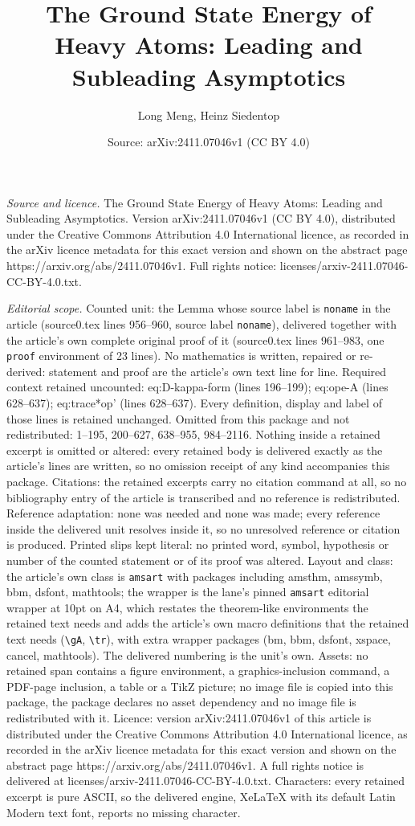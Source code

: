 \documentclass[10pt,a4paper]{amsart}
\title[The Ground State Energy of Heavy Atoms: Leading and Subleadi]{The Ground State Energy of Heavy Atoms: Leading and Subleading Asymptotics}
\author{Long Meng, Heinz Siedentop}
\date{Source: arXiv:2411.07046v1 (CC BY 4.0)}
\begin{document}
\maketitle

\noindent\emph{Source and licence.} The Ground State Energy of Heavy Atoms: Leading and Subleading Asymptotics. Version arXiv:2411.07046v1 (CC BY 4.0), distributed under the Creative Commons Attribution 4.0 International licence, as recorded in the arXiv licence metadata for this exact version and shown on the abstract page https://arxiv.org/abs/2411.07046v1. Full rights notice: licenses/arxiv-2411.07046-CC-BY-4.0.txt.\par\smallskip

\noindent\textit{Editorial scope.} Counted unit: the Lemma whose source label is \texttt{noname} in the article (source0.tex lines 956--960, source label \texttt{noname}), delivered together with the article's own complete original proof of it (source0.tex lines 961--983, one \texttt{proof} environment of 23 lines). No mathematics is written, repaired or re-derived: statement and proof are the article's own text line for line. Required context retained uncounted: eq:D-kappa-form (lines 196--199); eq:ope-A (lines 628--637); eq:trace*op' (lines 628--637). Every definition, display and label of those lines is retained unchanged. Omitted from this package and not redistributed: 1--195, 200--627, 638--955, 984--2116. Nothing inside a retained excerpt is omitted or altered: every retained body is delivered exactly as the article's lines are written, so no omission receipt of any kind accompanies this package. Citations: the retained excerpts carry no citation command at all, so no bibliography entry of the article is transcribed and no reference is redistributed. Reference adaptation: none was needed and none was made; every reference inside the delivered unit resolves inside it, so no unresolved reference or citation is produced. Printed slips kept literal: no printed word, symbol, hypothesis or number of the counted statement or of its proof was altered. Layout and class: the article's own class is \texttt{amsart} with packages including amsthm, amssymb, bbm, dsfont, mathtools; the wrapper is the lane's pinned \texttt{amsart} editorial wrapper at 10pt on A4, which restates the theorem-like environments the retained text needs and adds the article's own macro definitions that the retained text needs (\texttt{\textbackslash gA}, \texttt{\textbackslash tr}), with extra wrapper packages (bm, bbm, dsfont, xspace, cancel, mathtools). The delivered numbering is the unit's own. Assets: no retained span contains a figure environment, a graphics-inclusion command, a PDF-page inclusion, a table or a TikZ picture; no image file is copied into this package, the package declares no asset dependency and no image file is redistributed with it. Licence: version arXiv:2411.07046v1 of this article is distributed under the Creative Commons Attribution 4.0 International licence, as recorded in the arXiv licence metadata for this exact version and shown on the abstract page https://arxiv.org/abs/2411.07046v1. A full rights notice is delivered at licenses/arxiv-2411.07046-CC-BY-4.0.txt. Characters: every retained excerpt is pure ASCII, so the delivered engine, XeLaTeX with its default Latin Modern text font, reports no missing character.
\end{document}
